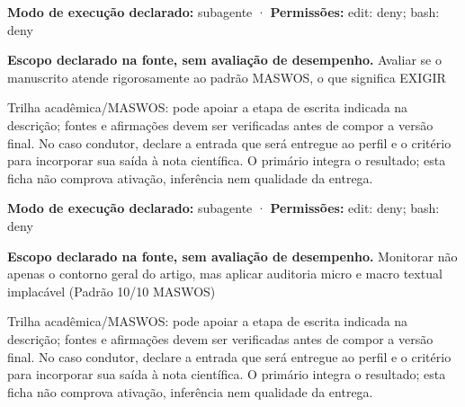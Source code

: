 \begin{arquitetura}
\textbf{Modo de execução declarado:} subagente · \textbf{Permissões:} edit: deny; bash: deny
\end{arquitetura}


\begin{descricao}
\textbf{Escopo declarado na fonte, sem avaliação de desempenho.}
Avaliar se o manuscrito atende rigorosamente ao padrão MASWOS, o que significa EXIGIR
\end{descricao}

\begin{funcao}
Trilha acadêmica/MASWOS: pode apoiar a etapa de escrita indicada na descrição; fontes e afirmações devem ser verificadas antes de compor a versão final. No caso condutor, declare a entrada que será entregue ao perfil e o critério para incorporar sua saída à nota científica. O primário integra o resultado; esta ficha não comprova ativação, inferência nem qualidade da entrega.
\end{funcao}

\begin{arquitetura}
\textbf{Modo de execução declarado:} subagente · \textbf{Permissões:} edit: deny; bash: deny
\end{arquitetura}


\begin{descricao}
\textbf{Escopo declarado na fonte, sem avaliação de desempenho.}
Monitorar não apenas o contorno geral do artigo, mas aplicar auditoria micro e macro textual implacável (Padrão 10/10 MASWOS)
\end{descricao}

\begin{funcao}
Trilha acadêmica/MASWOS: pode apoiar a etapa de escrita indicada na descrição; fontes e afirmações devem ser verificadas antes de compor a versão final. No caso condutor, declare a entrada que será entregue ao perfil e o critério para incorporar sua saída à nota científica. O primário integra o resultado; esta ficha não comprova ativação, inferência nem qualidade da entrega.
\end{funcao}

